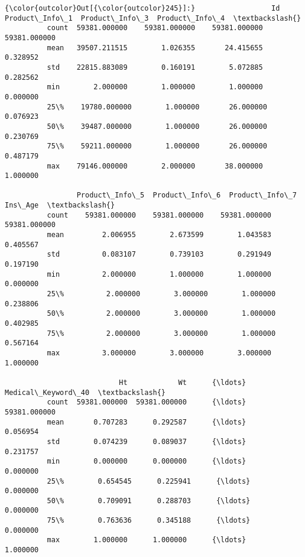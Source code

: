 \documentclass[11pt]{article}
\begin{document}
\begin{Verbatim}[commandchars=\\\{\}]
{\color{outcolor}Out[{\color{outcolor}245}]:}                  Id  Product\_Info\_1  Product\_Info\_3  Product\_Info\_4  \textbackslash{}
          count  59381.000000    59381.000000    59381.000000    59381.000000   
          mean   39507.211515        1.026355       24.415655        0.328952   
          std    22815.883089        0.160191        5.072885        0.282562   
          min        2.000000        1.000000        1.000000        0.000000   
          25\%    19780.000000        1.000000       26.000000        0.076923   
          50\%    39487.000000        1.000000       26.000000        0.230769   
          75\%    59211.000000        1.000000       26.000000        0.487179   
          max    79146.000000        2.000000       38.000000        1.000000   
          
                 Product\_Info\_5  Product\_Info\_6  Product\_Info\_7       Ins\_Age  \textbackslash{}
          count    59381.000000    59381.000000    59381.000000  59381.000000   
          mean         2.006955        2.673599        1.043583      0.405567   
          std          0.083107        0.739103        0.291949      0.197190   
          min          2.000000        1.000000        1.000000      0.000000   
          25\%          2.000000        3.000000        1.000000      0.238806   
          50\%          2.000000        3.000000        1.000000      0.402985   
          75\%          2.000000        3.000000        1.000000      0.567164   
          max          3.000000        3.000000        3.000000      1.000000   
          
                           Ht            Wt      {\ldots}       Medical\_Keyword\_40  \textbackslash{}
          count  59381.000000  59381.000000      {\ldots}             59381.000000   
          mean       0.707283      0.292587      {\ldots}                 0.056954   
          std        0.074239      0.089037      {\ldots}                 0.231757   
          min        0.000000      0.000000      {\ldots}                 0.000000   
          25\%        0.654545      0.225941      {\ldots}                 0.000000   
          50\%        0.709091      0.288703      {\ldots}                 0.000000   
          75\%        0.763636      0.345188      {\ldots}                 0.000000   
          max        1.000000      1.000000      {\ldots}                 1.000000   
          

\end{Verbatim}
\end{document}
